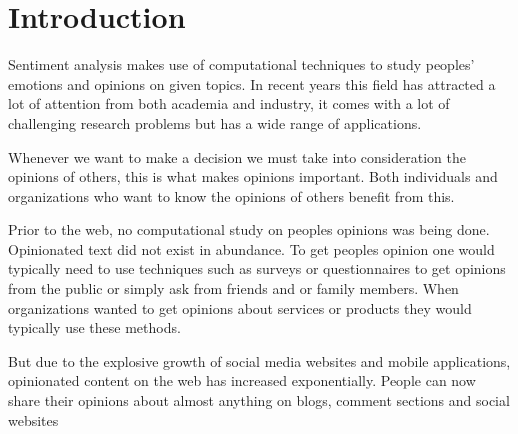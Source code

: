 \chapter{Introduction}\label{ch:INTRO}

Sentiment analysis makes use of computational techniques to study peoples' emotions and opinions
on given topics. In recent years this field has attracted a lot of attention from both academia and industry, it comes with a lot of challenging research problems but has a wide range of applications.

Whenever we want to make a decision we must take into consideration the opinions of others, this is what makes opinions important. Both individuals and organizations who want to know the opinions of others benefit from this.

Prior to the web,  no computational study on peoples opinions was being done. Opinionated text did not exist in abundance. To get peoples opinion one would typically need to use techniques such as surveys or questionnaires to get opinions from the public or simply ask from friends and or family members.
When organizations wanted to get opinions about services or products they would typically use these methods.   

But due to the explosive growth of social media websites and mobile applications, opinionated content on the web has increased exponentially. People can now share their opinions about almost anything on blogs, comment sections and social websites\cite{ref47}





